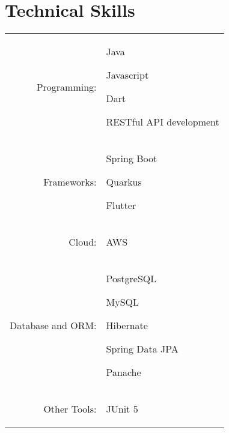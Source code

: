 \documentclass[a4paper,12pt]{article}
\begin{document}

\section{Technical Skills}
\vspace{2pt}
\begin{tabular}{rp{15.2cm}}
\raggedleft Programming:
& \begin{itemize*}[label=\Large\textbullet] %
    \item Java
    \item Javascript
    \item Dart
    \item RESTful API development
\end{itemize*}\\
\raggedleft Frameworks:
& \begin{itemize*}[label=\Large\textbullet]
    \item Spring Boot
    \item Quarkus
    \item Flutter
\end{itemize*}\\
\raggedleft Cloud:
& \begin{itemize*}[label=\Large\textbullet]
    \item AWS
\end{itemize*}\\
\raggedleft Database and ORM:
& \begin{itemize*}[label=\Large\textbullet]
    \item PostgreSQL
    \item MySQL
    \item Hibernate
    \item Spring Data JPA
    \item Panache
\end{itemize*}\\
\raggedleft Other Tools:
& \begin{itemize*}[label=\Large\textbullet]
    \item JUnit 5

\end{itemize*}
\end{tabular}
\end{document}
